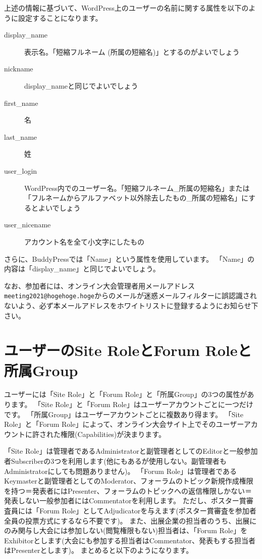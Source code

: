\documentclass[titlepage,10pt,a4paper,uplatex]{jsbook}
\begin{document}
上述の情報に基づいて、WordPress上のユーザーの名前に関する属性を以下のように設定することになります。

\begin{description}
\item[display\_name] 表示名。「短縮フルネーム (所属の短縮名)」とするのがよいでしょう
\item[nickname] display\_nameと同じでよいでしょう
\item[first\_name] 名
\item[last\_name] 姓
\item[user\_login] WordPress内でのユーザー名。「短縮フルネーム\_所属の短縮名」または「フルネームからアルファベット以外除去したもの\_所属の短縮名」にするとよいでしょう
\item[user\_nicename] アカウント名を全て小文字にしたもの
\end{description}

さらに、BuddyPressでは「Name」という属性を使用しています。
「Name」の内容は「display\_name」と同じでよいでしょう。

なお、参加者には、オンライン大会管理者用メールアドレス\texttt{meeting2021@hogehoge.hoge}からのメールが迷惑メールフィルターに誤認識されないよう、必ず本メールアドレスをホワイトリストに登録するようにお知らせ下さい。

\section{ユーザーのSite RoleとForum Roleと所属Group}

ユーザーには「Site Role」と「Forum Role」と「所属Group」の3つの属性があります。
「Site Role」と「Forum Role」はユーザーアカウントごとに一つだけです。
「所属Group」はユーザーアカウントごとに複数あり得ます。
「Site Role」と「Forum Role」によって、オンライン大会サイト上でそのユーザーアカウントに許された権限(Capabilities)が決まります。

「Site Role」は管理者であるAdministratorと副管理者としてのEditorと一般参加者Subscriberの3つを利用します(他にもあるが使用しない。副管理者もAdministratorにしても問題ありません)。
「Forum Role」は管理者であるKeymasterと副管理者としてのModerator、フォーラムのトピック新規作成権限を持つ＝発表者にはPresenter、フォーラムのトピックへの返信権限しかない＝発表しない一般参加者にはCommentatorを利用します。
ただし、ポスター賞審査員には「Forum Role」としてAdjudicatorを与えます(ポスター賞審査を参加者全員の投票方式にするなら不要です)。
また、出展企業の担当者のうち、出展にのみ関与し大会には参加しない(閲覧権限もない)担当者は、「Forum Role」をExhibitorとします(大会にも参加する担当者はCommentator、発表もする担当者はPresenterとします)。
まとめると以下のようになります。
\end{document}
